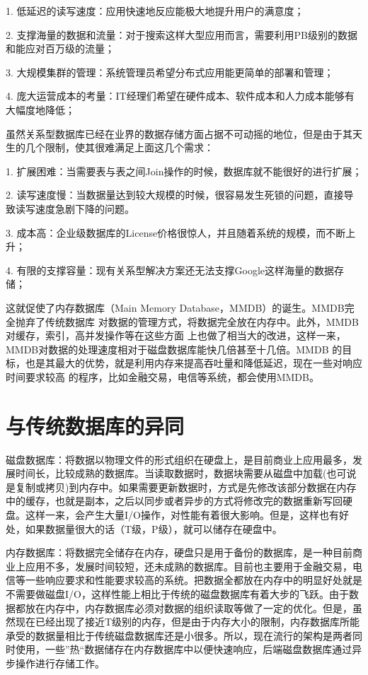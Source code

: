 \documentclass[literaturereview]{zjutreport}
\begin{document}
1. 低延迟的读写速度：应用快速地反应能极大地提升用户的满意度；

2. 支撑海量的数据和流量：对于搜索这样大型应用而言，需要利用PB级别的数据和能应对百万级的流量；

3. 大规模集群的管理：系统管理员希望分布式应用能更简单的部署和管理；

4. 庞大运营成本的考量：IT经理们希望在硬件成本、软件成本和人力成本能够有大幅度地降低；

虽然关系型数据库已经在业界的数据存储方面占据不可动摇的地位，但是由于其天生的几个限制，使其很难满足上面这几个需求：

1. 扩展困难：当需要表与表之间Join操作的时候，数据库就不能很好的进行扩展；

2. 读写速度慢：当数据量达到较大规模的时候，很容易发生死锁的问题，直接导致读写速度急剧下降的问题。

3. 成本高：企业级数据库的License价格很惊人，并且随着系统的规模，而不断上升；

4. 有限的支撑容量：现有关系型解决方案还无法支撑Google这样海量的数据存储；

这就促使了内存数据库（Main Memory Database，MMDB）的诞生。MMDB完全抛弃了传统数据库
对数据的管理方式，将数据完全放在内存中。此外，MMDB对缓存，索引，高并发操作等在这些方面
上也做了相当大的改进，这样一来，MMDB对数据的处理速度相对于磁盘数据库能快几倍甚至十几倍。MMDB
的目标，也是其最大的优势，就是利用内存来提高吞吐量和降低延迟，现在一些对响应时间要求较高
的程序，比如金融交易，电信等系统，都会使用MMDB。

\chapter{与传统数据库的异同}
磁盘数据库：将数据以物理文件的形式组织在硬盘上，是目前商业上应用最多，发展时间长，比较成熟的数据库。当读取数据时，数据块需要从磁盘中加载(也可说是复制或拷贝)到内存中。如果需要更新数据时，方式是先修改该部分数据在内存中的缓存，也就是副本，之后以同步或者异步的方式将修改完的数据重新写回硬盘。这样一来，会产生大量I/O操作，对性能有着很大影响。但是，这样也有好处，如果数据量很大的话（T级，P级），就可以储存在硬盘中。

内存数据库：将数据完全储存在内存，硬盘只是用于备份的数据库，是一种目前商业上应用不多，发展时间较短，还未成熟的数据库。目前也主要用于金融交易，电信等一些响应要求和性能要求较高的系统。把数据全都放在内存中的明显好处就是不需要做磁盘I/O，这样性能上相比于传统的磁盘数据库有着大步的飞跃。由于数据都放在内存中，内存数据库必须对数据的组织读取等做了一定的优化。但是，虽然现在已经出现了接近T级别的内存，但是由于内存大小的限制，内存数据库所能承受的数据量相比于传统磁盘数据库还是小很多。所以，现在流行的架构是两者同时使用，一些”热“数据储存在内存数据库中以便快速响应，后端磁盘数据库通过异步操作进行存储工作。
\end{document}
